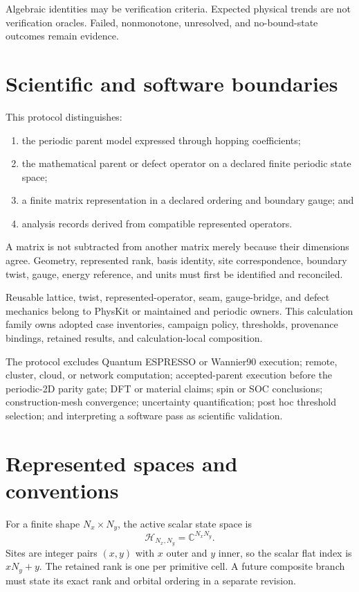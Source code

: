 \documentclass[11pt]{article}
\begin{document}
Algebraic identities may be verification criteria.  Expected physical trends are not
verification oracles.  Failed, nonmonotone, unresolved, and no-bound-state outcomes
remain evidence.

\section{Scientific and software boundaries}

This protocol distinguishes:

\begin{enumerate}[leftmargin=*]
  \item the periodic parent model expressed through hopping coefficients;
  \item the mathematical parent or defect operator on a declared finite periodic state
    space;
  \item a finite matrix representation in a declared ordering and boundary gauge; and
  \item analysis records derived from compatible represented operators.
\end{enumerate}

A matrix is not subtracted from another matrix merely because their dimensions agree.
Geometry, represented rank, basis identity, site correspondence, boundary twist, gauge,
energy reference, and units must first be identified and reconciled.

Reusable lattice, twist, represented-operator, seam, gauge-bridge, and defect mechanics
belong to PhysKit or maintained  and periodic owners.
This calculation family owns adopted case inventories, campaign policy, thresholds,
provenance bindings, retained results, and calculation-local composition.

The protocol excludes Quantum ESPRESSO or Wannier90 execution; remote, cluster, cloud,
or network computation; accepted-parent execution before the periodic-2D parity gate;
DFT or material claims; spin or SOC conclusions; construction-mesh convergence;
uncertainty quantification; post hoc threshold selection; and interpreting a software
pass as scientific validation.

\section{Represented spaces and conventions}

For a finite shape $N_x\times N_y$, the active scalar state space is
\begin{equation}
  \mathcal H_{N_x,N_y}=\mathbb C^{N_xN_y}.
\end{equation}
Sites are integer pairs $(x,y)$ with $x$ outer and $y$ inner, so the scalar flat index is
$xN_y+y$.  The retained rank is one per primitive cell.  A future composite branch must
state its exact rank and orbital ordering in a separate revision.
\end{document}
